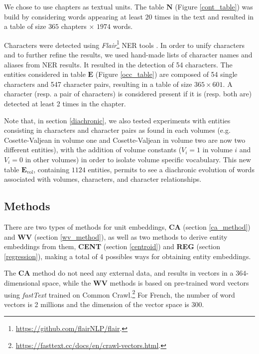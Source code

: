 \documentclass[
twocolumn,
]{ceurart}
\begin{document}
We chose to use chapters as textual units. The table $\mathbf{N}$ (Figure \ref{cont_table}) was build by considering words appearing at least $20$ times in the text and resulted in a table of size $365$ chapters $\times$ $1974$ words.

Characters were detected using \emph{Flair}\footnote{\url{https://github.com/flairNLP/flair}.} NER tools \cite{Akbik2018}. In order to unify characters and to further refine the results, we used hand-made lists of character names and aliases from NER results. It resulted in the detection of 54 characters. The entities considered in table $\mathbf{E}$ (Figure \ref{occ_table}) are composed of 54 single characters and 547 character pairs, resulting in a table of size $365 \times 601$. A character (resp. a pair of characters) is considered present if it is (resp. both are) detected at least 2 times in the chapter. 

Note that, in section \ref{diachronic}, we also tested experiments with entities consisting in characters and character pairs as found in each volumes (e.g. Cosette-Valjean in volume one and Cosette-Valjean in volume two are now two different entities), with the addition of volume constants ($V_i=1$ in volume $i$ and $V_i=0$ in other volumes) in order to isolate volume specific vocabulary. This new table $\mathbf{E}_\text{vol}$, containing $1124$ entities, permits to see a diachronic evolution of words associated with volumes, characters, and character relationships. 

\subsection{Methods}

There are two types of methods for unit embeddings, \textbf{CA} (section \ref{ca_method}) and \textbf{WV} (section \ref{wv_method}), as well as two methods to derive entity embeddings from them, \textbf{CENT} (section \ref{centroid}) and \textbf{REG} (section \ref{regression}), making a total of 4 possibles ways for obtaining entity embeddings. 

The \textbf{CA} method do not need any external data, and results in vectors in a $364$-dimensional space, while the $\textbf{WV}$ methods is based on pre-trained word vectors using \emph{fastText} \cite{Bojanowski2017} trained on Common Crawl.\footnote{\url{ https://fasttext.cc/docs/en/crawl-vectors.html}.} For French, the number of word vectors is 2 millions and the dimension of the vector space is $300$. 
\end{document}
